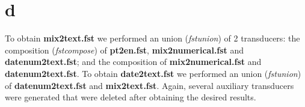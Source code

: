 \documentclass[12pt]{article}
\begin{document}
\vspace{-5mm}
\section*{d}
\vspace{-5mm}
\par To obtain \textbf{mix2text.fst} we performed an union (\textit{fstunion}) of 2 transducers: the composition (\textit{fstcompose}) of \textbf{pt2en.fst}, \textbf{mix2numerical.fst} and \textbf{datenum2text.fst}; and the composition of \textbf{mix2numerical.fst} and \textbf{datenum2text.fst}. To obtain \textbf{date2text.fst} we performed an union (\textit{fstunion}) of \textbf{datenum2text.fst} and \textbf{mix2text.fst}. Again, several auxiliary transducers were generated that were deleted after obtaining the desired results.
\vfill

\nocite{*}
\printbibliography
\end{document}
